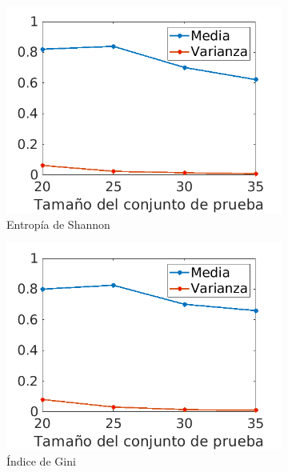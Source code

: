 \documentclass[a4paper]{article}
\begin{document}
  \begin{figure}[h]
    \centering
    \begin{subfigure}{.4\textwidth}
      \centering
      \includegraphics[width=\linewidth]{img/test-set-shannon.png}
      \caption{Entropía de Shannon}
      \label{test-size:sfig1}
    \end{subfigure}%
    \begin{subfigure}{.4\textwidth}
      \centering
      \includegraphics[width=\linewidth]{img/test-set-gini.png}
      \caption{Índice de Gini}
      \label{test-size:sfig2}
    \end{subfigure}
    \begin{subfigure}{.4\textwidth}
      \centering

\end{subfigure}
\end{figure}
\end{document}
